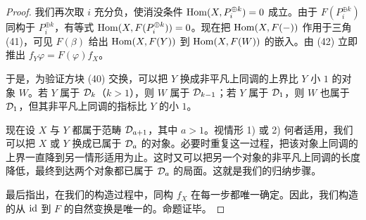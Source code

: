 \begin{proof}
我们再次取 $i$ 充分负，使消没条件 $\operatorname{Hom}(X,P_i^{\oplus k})=0$ 成立。由于 $F(P_i^{\oplus k})$ 同构于 $P_i^{\oplus k}$，有等式 $\operatorname{Hom}(X,F(P_i^{\oplus k}))=0$。现在把 $\operatorname{Hom}(X,F(-))$ 作用于三角 (41)，可见 $F(\beta)$ 给出 $\operatorname{Hom}(X,F(Y))$ 到 $\operatorname{Hom}(X,F(W))$ 的嵌入。由 (42) 立即推出 $f_Y\varphi=F(\varphi)f_X$。

于是，为验证方块 (40) 交换，可以把 $Y$ 换成非平凡上同调的上界比 $Y$ 小 $1$ 的对象 $W$。若 $Y$ 属于 $\mathcal{D}_k$（$k>1$），则 $W$ 属于 $\mathcal{D}_{k-1}$；若 $Y$ 属于 $\mathcal{D}_1$，则 $W$ 也属于 $\mathcal{D}_1$，但其非平凡上同调的指标比 $Y$ 的小 $1$。

现在设 $X$ 与 $Y$ 都属于范畴 $\mathcal{D}_{a+1}$，其中 $a>1$。视情形 1) 或 2) 何者适用，我们可以把 $X$ 或 $Y$ 换成已属于 $\mathcal{D}_a$ 的对象。必要时重复这一过程，把该对象上同调的上界一直降到另一情形适用为止。这时又可以把另一个对象的非平凡上同调的长度降低，最终到达两个对象都已属于 $\mathcal{D}_a$ 的局面。这就是我们的归纳步骤。

最后指出，在我们的构造过程中，同构 $f_X$ 在每一步都唯一确定。因此，我们构造的从 $\mathrm{id}$ 到 $F$ 的自然变换是唯一的。命题证毕。
\end{proof}

